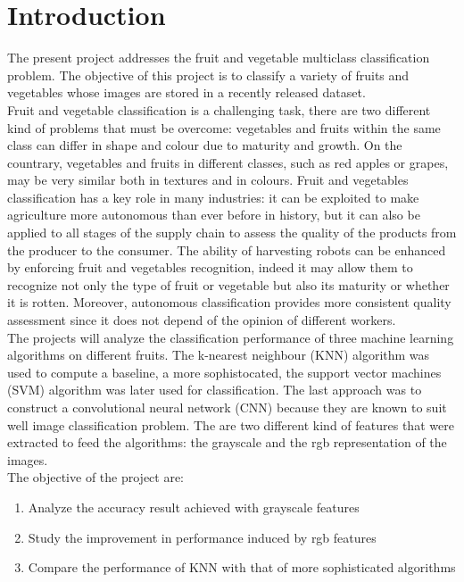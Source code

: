 \documentclass{article}
\begin{document}
\section{Introduction}
The present project addresses the fruit and vegetable multiclass classification problem. The objective of this project is to classify a variety of fruits and vegetables whose images are stored in a recently released dataset.\\
Fruit and vegetable classification is a challenging task, there are two different kind of problems that must be overcome: vegetables and fruits within the same class can differ in shape and colour due to maturity and growth. On the countrary, vegetables and fruits in different classes, such as red apples or grapes, may be very similar both in textures and in colours. 
Fruit and vegetables classification has a key role in many industries: it can be exploited to make agriculture more autonomous than ever before in history, but it can also be applied to all stages of the supply chain to assess the quality of the products from the producer to the consumer. 
The ability of harvesting robots can be enhanced by enforcing fruit and vegetables recognition, indeed it may allow them to recognize not only the type of fruit or vegetable but also its maturity or whether it is rotten. Moreover, autonomous classification provides more consistent quality assessment since it does not depend of the opinion of different workers.
\\
The projects will analyze the classification performance of three machine learning algorithms on different fruits. The k-nearest neighbour (KNN) algorithm was used to compute a baseline, a more sophistocated, the support vector machines (SVM) algorithm was later used for classification. The last approach was to construct a convolutional neural network (CNN) because they are known to suit well image classification problem. The are two different kind of features that were extracted to feed the algorithms: the grayscale and the rgb representation of the images.\\
The objective of the project are:
\begin{enumerate}
\item Analyze the accuracy result achieved with grayscale features
\item Study the improvement in performance induced by rgb features
\item Compare the performance of KNN with that of more sophisticated algorithms
\end{enumerate}
\end{document}
